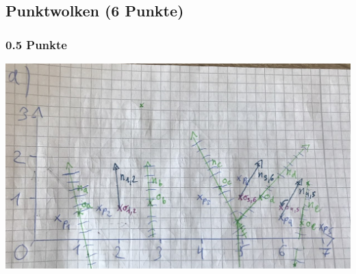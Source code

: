 \newif\ifvimbug
\vimbugfalse

\ifvimbug

\fi


\subsection{Punktwolken (6 Punkte)}
\subsubsection{0.5 Punkte}
\includegraphics[scale=0.5]{3b.jpg}
